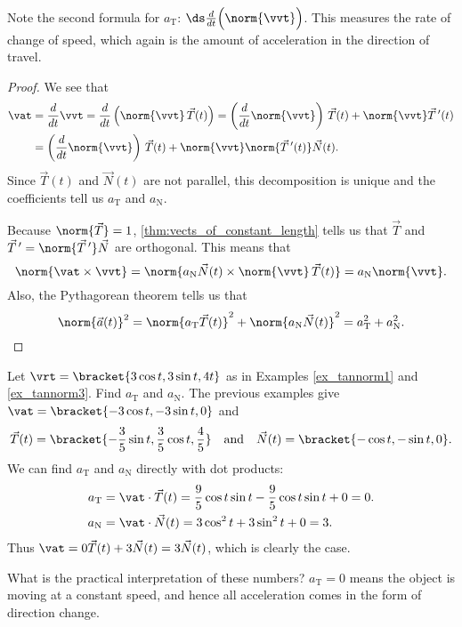 Note the second formula for $a_{\mathrm{T}}$: $\ds \frac{d}{dt}\Bigl(\norm{\vvt}\Bigr)$. This measures the rate of change of speed, which again is the amount of acceleration in the direction of travel.

\begin{proof}
We see that
\begin{align*}
 \vat
 &=\frac d{dt}\vvt=\frac d{dt}\left(\norm{\vvt}\,\vec T(t)\right)
 =\left(\frac d{dt}\norm{\vvt}\right)\,\vec T(t)+\norm{\vvt}\vec T\,'(t) \\
 &=\left(\frac d{dt}\norm{\vvt}\right)\,\vec T(t)+\norm{\vvt}\norm{\vec T\,'(t)}\vec N(t).
\end{align*}
Since $\vec T(t)$ and $\vec N(t)$ are not parallel, this decomposition is unique and the coefficients tell us $a_\mathrm{T}$ and $a_\mathrm{N}$.

Because $\norm{\vec T}=1$, \autoref{thm:vects_of_constant_length} tells us that $\vec T$ and $\vec T\,'=\norm{\vec T\,'}\vec N$ are orthogonal.  This means that
\[
 \norm{\vat\times\vvt}
 =\norm{a_\mathrm{N}\vec N(t)\times\norm{\vvt}\,\vec T(t)}
 =a_\mathrm{N}\norm{\vvt}.
\]
Also, the Pythagorean theorem tells us that
\[
 \norm{\vec a(t)}^2=\norm{a_\mathrm{T}\vec T(t)}^2+\norm{a_\mathrm{N}\vec N(t)}^2
 =a_\mathrm{T}^2+a_\mathrm{N}^2.\qedhere
\]
\end{proof}

\begin{example}\label{ex_tannorm5}
Let $\vrt =\bracket{3\cos t, 3\sin t, 4t}$ as in Examples \ref{ex_tannorm1} and \ref{ex_tannorm3}. Find $a_\mathrm{T}$ and $a_\mathrm{N}$.
\solution
The previous examples give $\vat =\bracket{-3\cos t,-3\sin t,0}$ and 
\[\vec T(t) =\bracket{-\frac35\sin t,\frac35\cos t,\frac45}\quad \text{and}\quad \vec N(t) =\bracket{-\cos t,-\sin t,0}.\]
We can find $a_\mathrm{T}$ and $a_\mathrm{N}$ directly with dot products:
\begin{align*}
a_\mathrm{T} &= \vat\cdot \vec T(t) = \frac95\cos t\sin t-\frac95\cos t\sin t+0 = 0.\\
a_\mathrm{N} &= \vat\cdot \vec N(t) = 3\cos^2t+3\sin^2t + 0 = 3.
\end{align*}
Thus $\vat = 0\vec T(t) + 3\vec N(t) = 3\vec N(t)$, which is clearly the case.

What is the practical interpretation of these numbers? $a_\mathrm{T}=0$ means the object is moving at a constant speed, and hence all acceleration comes in the form of direction change.
\end{example}

